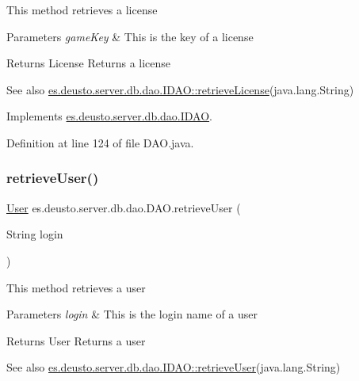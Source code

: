 This method retrieves a license 
\begin{DoxyParams}{Parameters}
{\em game\+Key} & This is the key of a license \\
\hline
\end{DoxyParams}
\begin{DoxyReturn}{Returns}
License Returns a license 
\end{DoxyReturn}
\begin{DoxySeeAlso}{See also}
\hyperlink{interfacees_1_1deusto_1_1server_1_1db_1_1dao_1_1_i_d_a_o_a6a3e25055d4a81c738d1bd73de6ef7da}{es.\+deusto.\+server.\+db.\+dao.\+I\+D\+A\+O\+::retrieve\+License}(java.\+lang.\+String) 
\end{DoxySeeAlso}


Implements \hyperlink{interfacees_1_1deusto_1_1server_1_1db_1_1dao_1_1_i_d_a_o_a6a3e25055d4a81c738d1bd73de6ef7da}{es.\+deusto.\+server.\+db.\+dao.\+I\+D\+AO}.



Definition at line 124 of file D\+A\+O.\+java.

\mbox{\label{classes_1_1deusto_1_1server_1_1db_1_1dao_1_1_d_a_o_a8c316b4c3bf246d00fb2b423a603ebe6}} 
\subsubsection{\texorpdfstring{retrieve\+User()}{retrieveUser()}}
{\footnotesize\ttfamily \hyperlink{classes_1_1deusto_1_1server_1_1db_1_1data_1_1_user}{User} es.\+deusto.\+server.\+db.\+dao.\+D\+A\+O.\+retrieve\+User (\begin{DoxyParamCaption}\item[{String}]{login }\end{DoxyParamCaption})}

This method retrieves a user 
\begin{DoxyParams}{Parameters}
{\em login} & This is the login name of a user \\
\hline
\end{DoxyParams}
\begin{DoxyReturn}{Returns}
User Returns a user 
\end{DoxyReturn}
\begin{DoxySeeAlso}{See also}
\hyperlink{interfacees_1_1deusto_1_1server_1_1db_1_1dao_1_1_i_d_a_o_a19f9b0d0b6f5f80730d6d197deca7dfc}{es.\+deusto.\+server.\+db.\+dao.\+I\+D\+A\+O\+::retrieve\+User}(java.\+lang.\+String) 
\end{DoxySeeAlso}


